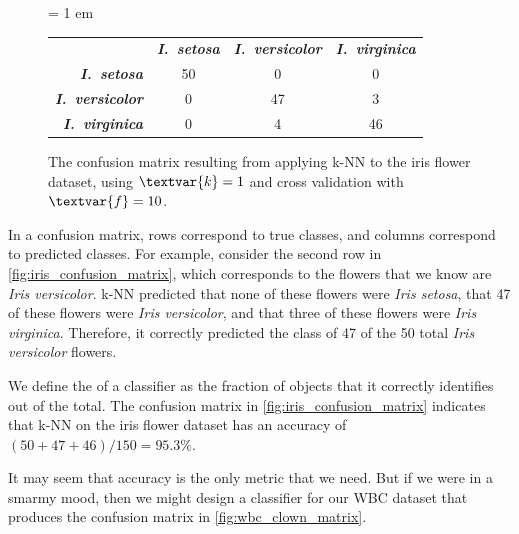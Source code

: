 \begin{figure}[h]
\centering
\tabcolsep = 1 em
\mySfFamily
{}
\begin{tabular}{r c c c}
\rowcolor{gray!50}
& \textbf{\textit{I.~setosa}} & \textbf{\textit{I.~versicolor}} & \textbf{\textit{I.~virginica}} \\
\textbf{\textit{I.~setosa}} & 50 & \phantom{5}0 & \phantom{5}0 \\
\textbf{\textit{I.~versicolor}} & \phantom{5}0 & 47 & \phantom{5}3 \\
\textbf{\textit{I.~virginica}} & \phantom{5}0 & \phantom{5}4 & 46
\end{tabular}
\caption{The confusion matrix resulting from applying k-NN to the iris flower dataset, using $\textvar{k} = \text{1}$ and cross validation with $\textvar{f} = \text{10}$.}
\label{fig:iris_confusion_matrix}
\end{figure}

In a confusion matrix, rows correspond to true classes, and columns correspond to predicted classes. For example, consider the second row in \autoref{fig:iris_confusion_matrix}, which corresponds to the flowers that we know are \textit{Iris versicolor}. k-NN predicted that none of these flowers were \textit{Iris setosa}, that 47 of these flowers were \textit{Iris versicolor}, and that three of these flowers were \textit{Iris virginica}. Therefore, it correctly predicted the class of 47 of the 50 total \textit{Iris versicolor} flowers.\\

\begin{note}\end{note}

We define the  of a classifier as the fraction of objects that it correctly identifies out of the total. The confusion matrix in \autoref{fig:iris_confusion_matrix} indicates that k-NN on the iris flower dataset has an accuracy of $(50 + 47 + 46)/150 = 95.3\%$.

It may seem that accuracy is the only metric that we need. But if we were in a smarmy mood, then we might design a classifier for our WBC dataset that produces the confusion matrix in \autoref{fig:wbc_clown_matrix}.\\

